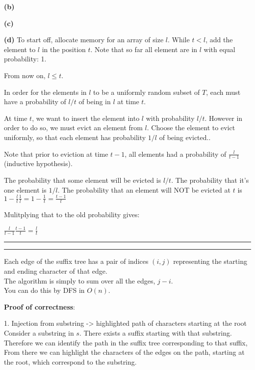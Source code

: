 \documentclass[11pt]{article}
\newcommand{\question}[2] {\vspace{.25in} \hrule\vspace{0.5em}
\noindent{\bf #1: #2} \vspace{0.5em}
\hrule \vspace{.10in}}
\renewcommand{\part}[1] {\vspace{.10in} {\bf (#1)}}
\begin{document}
\part{b}


\part{c}

\part{d}
To start off, allocate memory for an array of size $l$.
While $t<l$, add the element to $l$ in the position $t$.
Note that so far all element are in $l$ with equal probability: 1.

From now on, $l \leq t$.

In order for the elements in $l$ to be a uniformly random subset of $T$,
each must have a probability of $l/t$ of being in $l$ at time $t$.

At time $t$, we want to insert the element into $l$ with probability $l/t$.
However in order to do so, we must evict an element from $l$.
Choose the element to evict uniformly, so that each element has probability $1/l$ of being evicted..

Note that prior to eviction at time $t-1$, all elements had a probability of $\frac{l}{t-1}$ (inductive hypothesis).


The probability that some element will be evicted is $l/t$.
The probability that it's one element is $1/l$.
The probability that an element will NOT be evicted at $t$ is $1 - \frac{l}{t} \frac{1}{l} = 1 - \frac{1}{t} = \frac{t-1}{t}$

Mulitplying that to the old probability gives:

$\frac{l}{t-1} \frac{t-1}{t}  = \frac{l}{t}$



\question{2}{Counting Substrings}

Each edge of the suffix tree has a pair of indices $(i,j)$ representing the starting and ending character of that edge.\\
The algorithm is simply to sum over all the edges, $j-i$.\\
You can do this by DFS in $O(n)$.

\textbf{Proof of correctness}:

1. Injection from substring -> highlighted path of characters starting at the root\\
Consider a substring in $s$. There exists a suffix starting with that substring.\\
Therefore we can identify the path in the suffix tree corresponding to that suffix,\\
From there we can highlight the characters of the edges on the path, starting at the root, which correspond to the substring.
\end{document}
